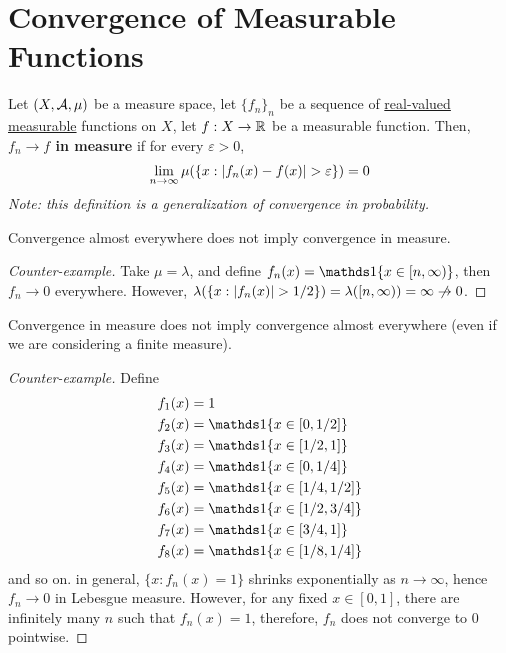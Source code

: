 \documentclass[11pt]{article}
\begin{document}
	\newpage
	\section{Convergence of Measurable Functions}
	\begin{definition}
		Let $(X, \mathcal{{A}}, \mu)$ be a measure space, let $\{f_n\}_n$ be a sequence of \ul{real-valued measurable} functions on $X$, let $f: X \to \mathbb{R}$ be a measurable function.
		Then, \textbf{$f_n \to f$ in measure} if for every $\varepsilon > 0$,
		\begin{align}
			\lim_{n\to\infty} \mu(\{x: \left \vert {f_n(x) - f(x)} \right \vert > \varepsilon \}) = 0
		\end{align}
		\emph{Note: this definition is a generalization of convergence in probability.}
	\end{definition}
	
	\begin{remark}
		Convergence almost everywhere does not imply convergence in measure.
		\begin{proof}[Counter-example]
			Take $\mu = \lambda$, and define $f_n(x) = \id{x \in [n, \infty)}$, then $f_n \to 0$ everywhere.
			However, $\lambda(\{x : \abs{f_n(x)} > 1/2\}) = \lambda([n, \infty)) = \infty \centernot{\to} 0$.
		\end{proof}
	\end{remark}
	
	\begin{remark}
		Convergence in measure does not imply convergence almost everywhere (even if we are considering a finite measure).
		\begin{proof}[Counter-example]
			Define
			\begin{align}
				f_1(x) &= 1 \\
				f_2(x) &= \id{x \in [0, 1/2]} \\
				f_3(x) &= \id{x \in [1/2, 1]} \\
				f_4(x) &= \id{x \in [0, 1/4]} \\
				f_5(x) &= \id{x \in [1/4, 1/2]} \\
				f_6(x) &= \id{x \in [1/2, 3/4]} \\
				f_7(x) &= \id{x \in [3/4, 1]} \\
				f_8(x) &= \id{x \in [1/8, 1/4]}
			\end{align}
			and so on. in general, $\{x : f_n(x) = 1\}$ shrinks exponentially as $n \to \infty$, hence $f_n \to 0$ in Lebesgue measure. However, for any fixed $x \in [0, 1]$, there are infinitely many $n$ such that $f_n(x) = 1$, therefore, $f_n$ does not converge to $0$ pointwise.
		\end{proof}
	\end{remark}
	
\end{document}
